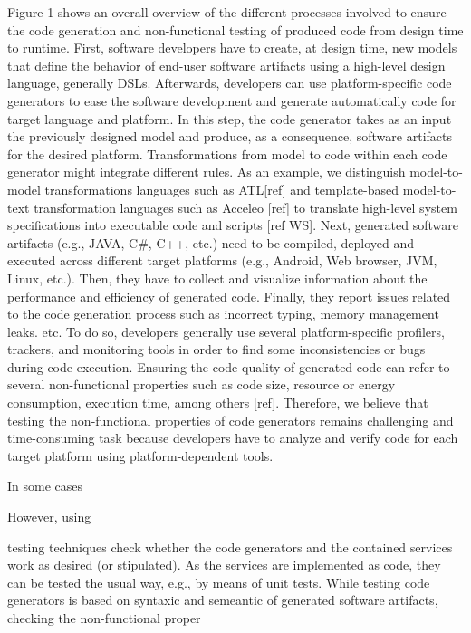 Figure 1 shows an overall overview of the different processes involved to ensure the code generation and non-functional testing of produced code from design time to runtime.
First, software developers have to create, at design time, new models that define the behavior of end-user software artifacts using a high-level design language, generally DSLs. Afterwards, developers can use platform-specific code generators to ease the software development and generate automatically code for target language and platform. In this step, the code generator takes as an input the previously designed model and produce, as a consequence, software artifacts for the desired platform. Transformations from model to code within each code generator might integrate different rules. As an example, we distinguish model-to-model transformations languages such as ATL[ref] and template-based model-to-text transformation languages such as Acceleo [ref] to translate high-level system specifications into executable code and scripts [ref WS]. Next, generated software artifacts (e.g., JAVA, C\#, C++, etc.) need to be compiled, deployed and executed across different target platforms (e.g., Android, Web browser, JVM, Linux, etc.). 
 Then, they have to collect and visualize information about the performance and efficiency of generated code. Finally, they report issues related to the code generation process such as incorrect typing, memory management leaks. etc. To do so, developers generally use several platform-specific profilers, trackers, and monitoring tools in order to find some inconsistencies or bugs during code execution. Ensuring the code quality of generated code can refer to several non-functional properties such as code size,
resource or energy consumption, execution time, among others
[ref]. Therefore, we believe that testing the non-functional
properties of code generators remains challenging and time-consuming
task because developers have to analyze and verify
code for each target platform using platform-dependent tools.

In some cases

However, using 




\iffalse 
testing techniques check whether the code
generators and the contained services work as desired (or stipulated). As the
services are implemented as code, they can be tested the usual way, e.g., by
means of unit tests.  
While testing code generators is based on syntaxic and semeantic of generated software artifacts, checking the non-functional proper





